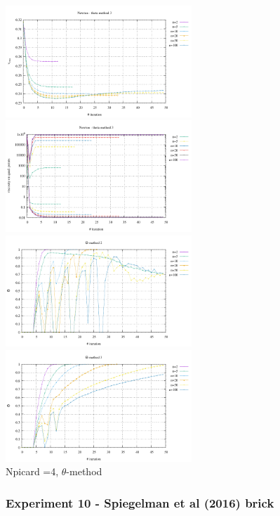 \begin{center}
\includegraphics[width=7cm]{python_codes/fieldstone_87/results/experiment_09/vrms_meth3.pdf}
\includegraphics[width=7cm]{python_codes/fieldstone_87/results/experiment_09/stats_etaq_meth3.pdf}\\
\includegraphics[width=7cm]{python_codes/fieldstone_87/results/experiment_09/theta_meth2.pdf}
\includegraphics[width=7cm]{python_codes/fieldstone_87/results/experiment_09/theta_meth3.pdf}\\
{\captionfont Npicard =4, $\theta$-method}
\end{center}


\newpage
\subsubsection*{Experiment 10 - Spiegelman et al (2016) brick}



